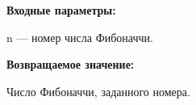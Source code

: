 \textbf{Входные параметры:}  
 
 n --- номер числа Фибоначчи.

\textbf{Возвращаемое значение:}
 
 Число Фибоначчи, заданного номера.